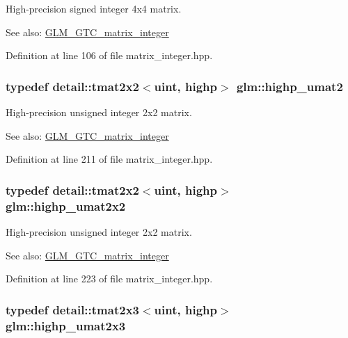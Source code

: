 High-precision signed integer 4x4 matrix. \begin{Desc}
\item[See also:]\hyperlink{group__gtc__matrix__integer}{GLM\_\-GTC\_\-matrix\_\-integer} \end{Desc}


Definition at line 106 of file matrix\_\-integer.hpp.\hypertarget{group__gtc__matrix__integer_g0c89800e3f63f82da4a4159004811cec}{
\subsubsection[highp\_\-umat2]{\setlength{\rightskip}{0pt plus 5cm}typedef detail::tmat2x2$<$uint, highp$>$ {\bf glm::highp\_\-umat2}}}
\label{group__gtc__matrix__integer_g0c89800e3f63f82da4a4159004811cec}


High-precision unsigned integer 2x2 matrix. \begin{Desc}
\item[See also:]\hyperlink{group__gtc__matrix__integer}{GLM\_\-GTC\_\-matrix\_\-integer} \end{Desc}


Definition at line 211 of file matrix\_\-integer.hpp.\hypertarget{group__gtc__matrix__integer_g428410468e33d16dc8aee08b17166669}{
\subsubsection[highp\_\-umat2x2]{\setlength{\rightskip}{0pt plus 5cm}typedef detail::tmat2x2$<$uint, highp$>$ {\bf glm::highp\_\-umat2x2}}}
\label{group__gtc__matrix__integer_g428410468e33d16dc8aee08b17166669}


High-precision unsigned integer 2x2 matrix. \begin{Desc}
\item[See also:]\hyperlink{group__gtc__matrix__integer}{GLM\_\-GTC\_\-matrix\_\-integer} \end{Desc}


Definition at line 223 of file matrix\_\-integer.hpp.\hypertarget{group__gtc__matrix__integer_g309076d055b5511a7071ebb5f660ed83}{
\subsubsection[highp\_\-umat2x3]{\setlength{\rightskip}{0pt plus 5cm}typedef detail::tmat2x3$<$uint, highp$>$ {\bf glm::highp\_\-umat2x3}}}
\label{group__gtc__matrix__integer_g309076d055b5511a7071ebb5f660ed83}


